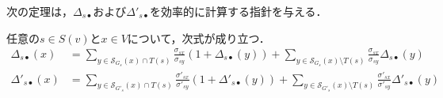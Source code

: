 次の定理は，$\Delta_{s\bullet}$および$\Delta'_{s\bullet}$を効率的に計算する指針を与える．
\begin{theorem}
  任意の$s\in S(v)$と$x\in V$について，次式が成り立つ．
  \begin{align}
    \Delta_{s\bullet}(x)
    &=\sum_{y\in\mathcal{S}_{G_s}(x)\cap T(s)}\frac{\sigma_{sx}}{\sigma_{sy}}(1+\Delta_{s\bullet}(y))
    +\sum_{y\in\mathcal{S}_{G_s}(x)\setminus T(s)}\frac{\sigma_{sx}}{\sigma_{sy}}\Delta_{s\bullet}(y)
    \label{eq:delta-dependency-1} \\
    \Delta'_{s\bullet}(x)
    &=\sum_{y\in\mathcal{S}_{G'_s}(x)\cap T(s)}\frac{\sigma'_{sx}}{\sigma'_{sy}}(1+\Delta'_{s\bullet}(y))
    +\sum_{y\in\mathcal{S}_{G'_s}(x)\setminus T(s)}\frac{\sigma'_{sx}}{\sigma'_{sy}}\Delta'_{s\bullet}(y)
    \label{eq:delta-dependency-2}
  \end{align}
\end{theorem}
